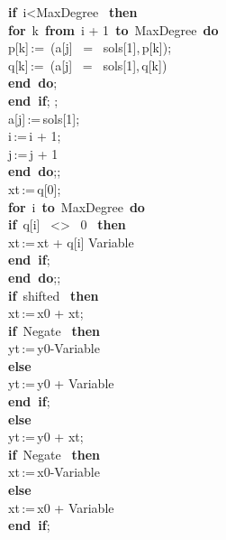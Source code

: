 \documentclass{article}
\begin{document}
\begin{maplelatex}
\begin{center}
\begin{maplelatex}
\begin{center}
{ \textbf{if} \,i<MaxDegree \, \textbf{then} \\
 \textbf{for} \,k \,\textbf{from} \,i + 1 \,\textbf{to} \,MaxDegree \,\textbf{do}\\
 p[k]\,:=\, (a[j] \, = \, sols[1],\,p[k]);\\
 q[k]\,:=\, (a[j] \, = \, sols[1],\,q[k])\\
 \textbf{end\ do};\\
 \textbf{end\ if}; ;\\
 a[j]\,:=\,sols[1];\\
 i\,:=\,i + 1;\\
 j\,:=\,j + 1\\
 \textbf{end\ do};;\\
 xt\,:=\,q[0];\\
 \textbf{for} \,i \,\textbf{to} \,MaxDegree \,\textbf{do}\\
 \textbf{if} \,q[i] \, <> \, 0 \, \textbf{then} \\
 xt\,:=\,xt + q[i] \ast Variable\\
 \textbf{end\ if}; \\
 \textbf{end\ do};;\\
 \textbf{if} \,shifted \, \textbf{then} \\
 xt\,:=\,x0 + xt;\\
 \textbf{if} \,Negate \, \textbf{then} \\
 yt\,:=\,y0-Variable\\
 \textbf{else}\\
 yt\,:=\,y0 + Variable\\
 \textbf{end\ if}; \\
 \textbf{else}\\
 yt\,:=\,y0 + xt;\\
 \textbf{if} \,Negate \, \textbf{then} \\
 xt\,:=\,x0-Variable\\
 \textbf{else}\\
 xt\,:=\,x0 + Variable\\
 \textbf{end\ if}; \\
}
\end{center}
\end{maplelatex}
\end{center}
\end{maplelatex}
\end{document}

